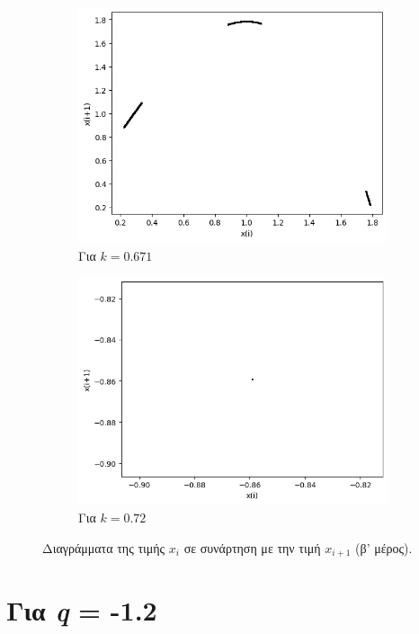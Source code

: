 \begin{figure}
\begin{subfigure}[b]{0.4\textwidth}
		\includegraphics[width=\textwidth]{LateX images/graphs q09/g11}
		\caption{Για $k=0.671$}
		\label{f:k57}
	\end{subfigure}
	\hfill
	\begin{subfigure}[b]{0.4\textwidth}
		\centering
		\includegraphics[width=\textwidth]{LateX images/graphs q09/g12}
		\caption{Για $k=0.72$}
		\label{f:k58}
	\end{subfigure}
	\hfill
	\caption{Διαγράμματα της τιμής \(x_i\) σε συνάρτηση με την τιμή \(x_{i+1}\) (β' μέρος).}
\end{figure}

\clearpage

\section{Για \emph{q} = -1.2}


